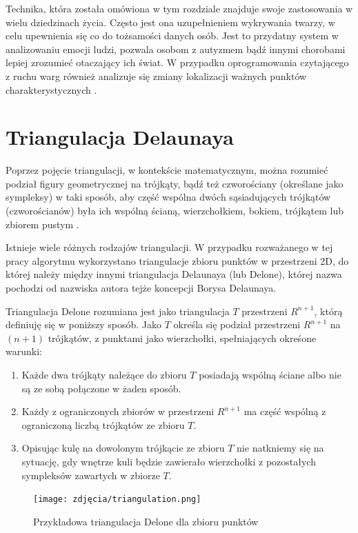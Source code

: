Technika, która została omówiona w tym rozdziale znajduje swoje zastosowania w wielu dziedzinach życia. Często jest ona uzupełnieniem wykrywania twarzy, w celu upewnienia się co do tożsamości danych osób. Jest to przydatny system w analizowaniu emocji ludzi, pozwala osobom z autyzmem bądź innymi chorobami lepiej zrozumieć otaczający ich świat. W przypadku oprogramowania czytającego z ruchu warg również analizuje się zmiany lokalizacji ważnych punktów charakterystycznych \cite{fDetection2}.


\section{Triangulacja Delaunaya}
Poprzez pojęcie triangulacji, w kontekście matematycznym, można rozumieć podział figury geometrycznej na trójkąty, bądź też czworościany (określane jako sympleksy) w taki sposób, aby część wspólna dwóch sąsiadujących trójkątów (czworościanów) była ich wspólną ścianą, wierzchołkiem, bokiem, trójkątem lub zbiorem pustym \cite{triangulation}.

Istnieje wiele różnych rodzajów triangulacji. W przypadku rozważanego w tej pracy algorytmu wykorzystano triangulacje zbioru punktów w przestrzeni 2D, do której należy między innymi triangulacja Delaunaya (lub Delone), której nazwa pochodzi od nazwiska autora tejże koncepcji Borysa Delaunaya. 

Triangulacja Delone \cite{tDelone} rozumiana jest jako triangulacja $T$ przestrzeni $R^{n+1}$, którą definiuję się w poniższy sposób. Jako $T$ określa się podział przestrzeni $R^{n+1}$ na $(n+1)$ trójkątów, z punktami jako wierzchołki, spełniających okreśone warunki:

\begin{enumerate}
    \item Każde dwa trójkąty należące do zbioru $T$ posiadają wspólną ściane albo nie są ze sobą połączone w żaden sposób.
    \item Każdy z ograniczonych zbiorów w przestrzeni $R^{n+1}$ ma część wspólną z ograniczoną liczbą trójkątów ze zbioru $T$.
    \item Opisując kulę na dowolonym trójkącie ze zbioru $T$ nie natkniemy się na sytuację, gdy wnętrze kuli będzie zawierało wierzchołki z pozostałych sympleksów zawartych w zbiorze $T$.
\end{enumerate}

\begin{figure}[h]
	\centering
	\texttt{[image: zdjęcia/triangulation.png]}
	\caption{Przykładowa triangulacja Delone dla zbioru punktów \cite{tDelone}}
	\label{fig:delone}
\end{figure}

